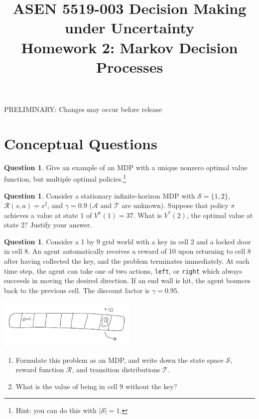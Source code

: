 \documentclass{article}
\title{ASEN 5519-003 Decision Making under Uncertainty\\
       Homework 2: Markov Decision Processes}
\theoremstyle{definition}
\newtheorem{question}[thm]{Question}
\begin{document}
\maketitle

{\Large PRELIMINARY: Changes may occur before release}

\section{Conceptual Questions}

\begin{question}
    Give an example of an MDP with a unique nonzero optimal value function, but multiple optimal policies.\footnote{Hint: you can do this with $|\mathcal{S}| = 1$.}
\end{question}

\begin{question}
    Consider a stationary infinite-horizon MDP with $\mathcal{S} = \{1,2\}$, $\mathcal{R}(s, a) = s^2$, and $\gamma = 0.9$ ($\mathcal{A}$ and $\mathcal{T}$ are unknown). Suppose that policy $\pi$ achieves a value at state $1$ of $V^\pi(1) = 37$. What is $V^*(2)$, the optimal value at state $2$? Justify your answer.
\end{question}

\begin{question}
    Consider a 1 by 9 grid world with a key in cell 2 and a locked door in cell 8. An agent automatically receives a reward of 10 upon returning to cell 8 after having collected the key, and the problem terminates immediately. At each time step, the agent can take one of two actions, \texttt{left}, or \texttt{right} which always succeeds in moving the desired direction. If an end wall is hit, the agent bounces back to the previous cell. The discount factor is $\gamma=0.95$.
\begin{center}
    \includegraphics[width=0.5\textwidth]{small_mdp.pdf}
\end{center}

\begin{enumerate}[label=\alph*]
        \item Formulate this problem as an MDP, and write down the state space $\mathcal{S}$, reward function $\mathcal{R}$, and transition distributions $\mathcal{T}$.
        \item What is the value of being in cell 9 without the key?
    \end{enumerate}

\end{question}
\end{document}

